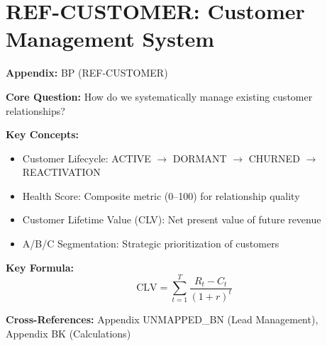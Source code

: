 \chapter{REF-CUSTOMER: Customer Management System}
\label{app:customer-management}

\begin{abstract}
This appendix documents the Customer Management System for FehrAdvice \& Partners AG.
It provides the complete specification for managing existing customer relationships,
including lifecycle management (ACTIVE $\rightarrow$ DORMANT $\rightarrow$ CHURNED),
relationship health tracking, project management, and revenue/CLV calculations.
The system integrates with the Lead Management System (Appendix UNMAPPED_BN) to provide
end-to-end client lifecycle coverage from initial lead to long-term customer.
\end{abstract}

\begin{tcolorbox}[colback=blue!5!white, colframe=blue!75!black,
    title=Quick Reference: Customer Management System]

\textbf{Appendix:} BP (REF-CUSTOMER)

\textbf{Core Question:} How do we systematically manage existing customer relationships?

\textbf{Key Concepts:}
\begin{itemize}[nosep]
\item Customer Lifecycle: ACTIVE $\rightarrow$ DORMANT $\rightarrow$ CHURNED $\rightarrow$ REACTIVATION
\item Health Score: Composite metric (0--100) for relationship quality
\item Customer Lifetime Value (CLV): Net present value of future revenue
\item A/B/C Segmentation: Strategic prioritization of customers
\end{itemize}

\textbf{Key Formula:}
\begin{equation}
\text{CLV} = \sum_{t=1}^{T} \frac{R_t - C_t}{(1+r)^t}
\end{equation}

\textbf{Cross-References:} Appendix UNMAPPED_BN (Lead Management), Appendix BK (Calculations)
\end{tcolorbox}

